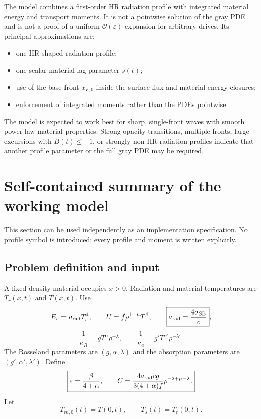 \documentclass[11pt]{article}
\numberwithin{equation}{section}
\newcommand{\Ts}{T_s}
\newcommand{\Tr}{T_r}
\newcommand{\Tm}{T_{m,0}}
\newcommand{\xfzero}{x_{F,0}}
\newcommand{\eps}{\varepsilon}
\newcommand{\arad}{a_{\rm rad}}
\newcommand{\order}{\mathcal{O}}
\begin{document}
The model combines a first-order HR radiation profile with integrated material
energy and transport moments.  It is not a pointwise solution of the gray PDE
and is not a proof of a uniform $\order(\eps)$ expansion for arbitrary drives.
Its principal approximations are:
\begin{itemize}
 \item one HR-shaped radiation profile;
 \item one scalar material-lag parameter $s(t)$;
 \item use of the base front $\xfzero$ inside the surface-flux and material-energy
       closures;
 \item enforcement of integrated moments rather than the PDEs pointwise.
\end{itemize}
The model is expected to work best for sharp, single-front waves with smooth
power-law material properties.  Strong opacity transitions, multiple fronts,
large excursions with $B(t)\le-1$, or strongly non-HR radiation profiles
indicate that another profile parameter or the full gray PDE may be required.

\clearpage
\section{Self-contained summary of the working model}
\label{sec:summary}

This section can be used independently as an implementation specification.
No profile symbol is introduced; every profile and moment is written
explicitly.

\subsection*{Problem definition and input}

A fixed-density material occupies $x>0$.  Radiation and material temperatures
are $\Tr(x,t)$ and $T(x,t)$.  Use
\begin{equation}
 E_r=\arad\Tr^4,
 \qquad
 U=f\rho^{1-\mu}T^\beta,
 \qquad
 \boxed{\arad=\frac{4\sigma_{\rm SB}}{c}},
 \label{eq:sum_energies}
\end{equation}
\begin{equation}
 \frac{1}{\kappa_R}=gT^\alpha\rho^{-\lambda},
 \qquad
 \frac{1}{\kappa_a}=g'T^{\alpha'}\rho^{-\lambda'}.
 \label{eq:sum_opacities}
\end{equation}
The Rosseland parameters are $(g,\alpha,\lambda)$ and the absorption parameters
are $(g',\alpha',\lambda')$.  Define
\begin{equation}
 \boxed{
 \eps=\frac{\beta}{4+\alpha},
 \qquad
 C=\frac{4\arad c g}{3(4+\alpha)f}
 \rho^{-2+\mu-\lambda}.}
 \label{eq:sum_constants}
\end{equation}
Let
\begin{equation}
 \boxed{\Tm(t)=T(0,t),\qquad \Ts(t)=\Tr(0,t).}
 \label{eq:sum_surface_temperatures}
\end{equation}
\end{document}
